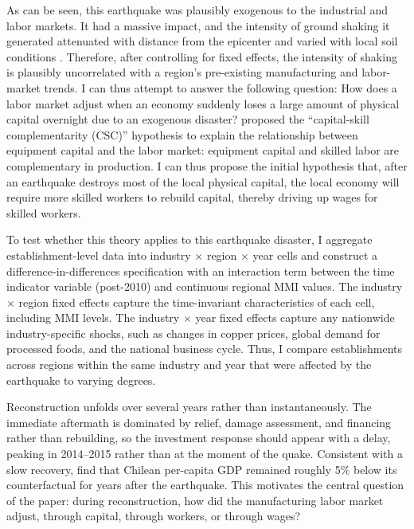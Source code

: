 \documentclass[12pt]{article}
\begin{document}
As can be seen, this earthquake was plausibly exogenous to the industrial and labor markets. It
had a massive impact, and the intensity of ground shaking it generated attenuated with distance
from the epicenter and varied with local soil conditions \citep{wald1999,waldallen2007}. Therefore, after controlling for fixed
effects, the intensity of shaking is plausibly uncorrelated with a region's pre-existing
manufacturing and labor-market trends. I can thus attempt to answer the following question: How
does a labor market adjust when an economy suddenly loses a large amount of physical capital
overnight due to an exogenous disaster? \citet{krusell2000} proposed the ``capital-skill
complementarity (CSC)'' hypothesis to explain the relationship between equipment capital and the
labor market: equipment capital and skilled labor are complementary in production. I can thus
propose the initial hypothesis that, after an earthquake destroys most of the local physical
capital, the local economy will require more skilled workers to rebuild capital, thereby driving
up wages for skilled workers.

To test whether this theory applies to this earthquake disaster, I aggregate establishment-level
data into industry $\times$ region $\times$ year cells and construct a difference-in-differences
specification with an interaction term between the time indicator variable (post-2010) and
continuous regional MMI values. The industry $\times$ region fixed effects capture the
time-invariant characteristics of each cell, including MMI levels. The industry $\times$ year
fixed effects capture any nationwide industry-specific shocks, such as changes in copper prices,
global demand for processed foods, and the national business cycle. Thus, I compare establishments
across regions within the same industry and year that were affected by the earthquake to varying
degrees.

Reconstruction unfolds over several years rather than instantaneously. The immediate aftermath is
dominated by relief, damage assessment, and financing rather than rebuilding, so the investment
response should appear with a delay, peaking in 2014--2015 rather than at the moment of the quake.
Consistent with a slow recovery, \citet{diaz2024} find that Chilean per-capita GDP remained
roughly 5\% below its counterfactual for years after the earthquake. This motivates the central
question of the paper: during reconstruction, how did the manufacturing labor market adjust,
through capital, through workers, or through wages?
\end{document}

